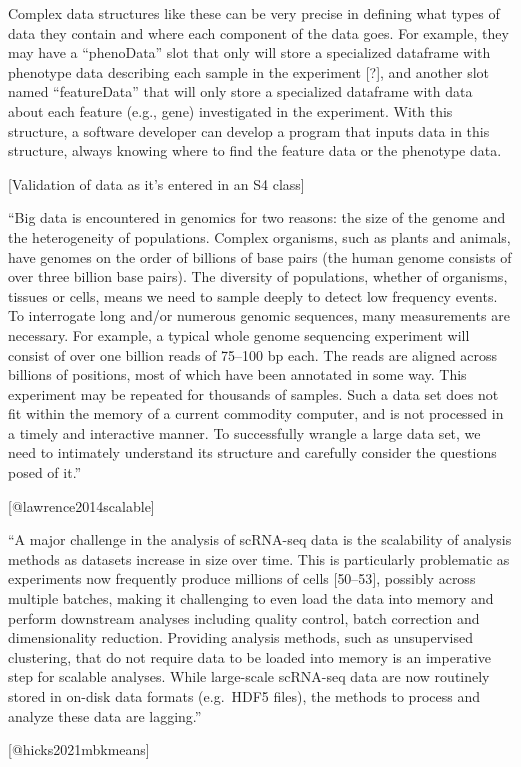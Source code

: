 \documentclass[]{tufte-book}
\begin{document}
Complex data structures like these can be very precise in defining what types of
data they contain and where each component of the data goes. For example,
they may have a ``phenoData'' slot that only will store a specialized
dataframe with phenotype data describing each sample in the experiment {[}?{]},
and another slot named ``featureData'' that will only store a specialized
dataframe with data about each feature (e.g., gene) investigated in the experiment.
With this structure, a software developer can develop a program that inputs
data in this structure, always knowing where to find the feature data or the
phenotype data.

{[}Validation of data as it's entered in an S4 class{]}

\begin{marginfigure}
``Big data is encountered in genomics for two reasons: the size of the
genome and the heterogeneity of populations. Complex organisms, such as
plants and animals, have genomes on the order of billions of base pairs
(the human genome consists of over three billion base pairs). The
diversity of populations, whether of organisms, tissues or cells, means
we need to sample deeply to detect low frequency events. To interrogate
long and/or numerous genomic sequences, many measurements are necessary.
For example, a typical whole genome sequencing experiment will consist
of over one billion reads of 75--100 bp each. The reads are aligned
across billions of positions, most of which have been annotated in some
way. This experiment may be repeated for thousands of samples. Such a
data set does not fit within the memory of a current commodity computer,
and is not processed in a timely and interactive manner. To successfully
wrangle a large data set, we need to intimately understand its structure
and carefully consider the questions posed of it.''

{[}@lawrence2014scalable{]}
\end{marginfigure}

\begin{marginfigure}
``A major challenge in the analysis of scRNA-seq data is the scalability
of analysis methods as datasets increase in size over time. This is
particularly problematic as experiments now frequently produce millions
of cells {[}50--53{]}, possibly across multiple batches, making it
challenging to even load the data into memory and perform downstream
analyses including quality control, batch correction and dimensionality
reduction. Providing analysis methods, such as unsupervised clustering,
that do not require data to be loaded into memory is an imperative step
for scalable analyses. While large-scale scRNA-seq data are now
routinely stored in on-disk data formats (e.g.~HDF5 files), the methods
to process and analyze these data are lagging.''

{[}@hicks2021mbkmeans{]}
\end{marginfigure}
\end{document}
